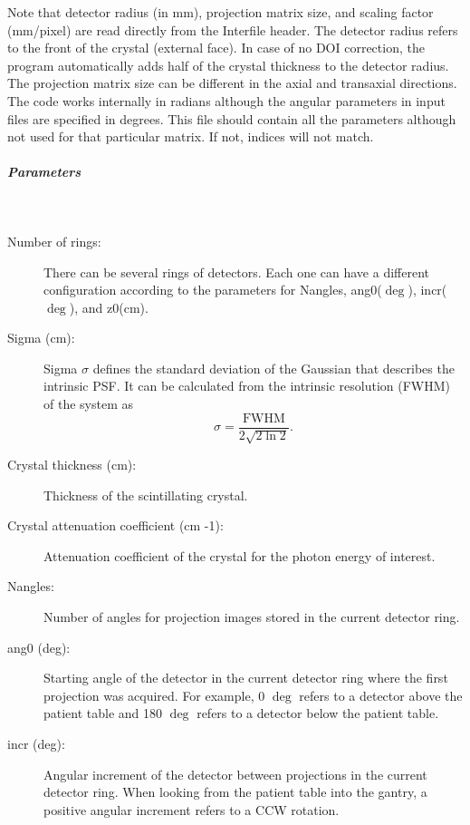 \documentclass{article}
\newcommand{\subsubsubsubsection}[1]{\subparagraph{#1} \mbox{} \\}
\begin{document}
{{{{\noindent Note that detector radius (in mm), projection matrix size, and scaling factor (mm/pixel) are read directly from the Interfile header. The detector radius refers to the front of the crystal (external face). In case of no DOI correction, the program automatically adds half of the crystal thickness to the detector radius. The projection matrix size can be different in the axial and transaxial directions. The code works internally in radians although the angular parameters in input files are specified in degrees. This file should contain all the parameters although not used for that particular matrix. If not, indices will not match.

{ \subsubsubsubsection{Parameters} }
\begin{description}

\item[Number of rings:] There can be several rings of detectors. Each one can have a different configuration according to the parameters for Nangles, ang0($\mathrm{\deg}$), incr($\mathrm{\deg}$), and z0($\mathrm{cm}$).

\item[Sigma (cm):] Sigma $\sigma$ defines the standard deviation of the Gaussian that describes the intrinsic PSF. It can be calculated from the intrinsic resolution (FWHM) of the system as 
\begin{equation}
 \sigma = \frac{\mathrm{FWHM}}{2\sqrt{2\ln{2}}}.
\end{equation}

\item[Crystal thickness (cm):] Thickness of the scintillating crystal.

\item[Crystal attenuation coefficient (cm -1):] Attenuation coefficient of the crystal for the photon energy of interest.

\item[Nangles:] Number of angles for projection images stored in the current detector ring.

\item[ang0 (deg):] Starting angle of the detector in the current detector ring where the first projection was acquired. For example, 0 $\mathrm{\deg}$ refers to a detector above the patient table and 180 $\mathrm{\deg}$ refers to a detector below the patient table.

\item[incr (deg):] Angular increment of the detector between projections in the current detector ring. When looking from the patient table into the gantry, a positive angular increment refers to a CCW rotation.


\end{description}}}}}
\end{document}
